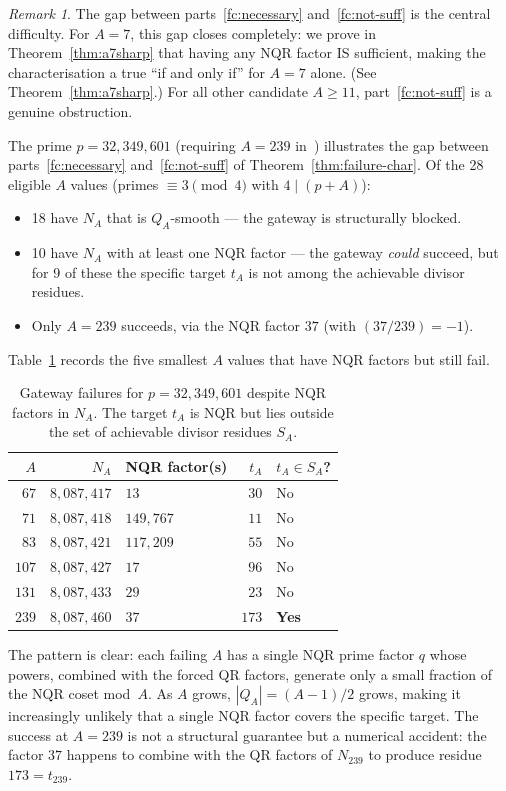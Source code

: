 \documentclass[12pt]{amsart}
\theoremstyle{definition}
\theoremstyle{remark}
\newtheorem{remark}[theorem]{Remark}
\begin{document}
\begin{remark}\label{rem:iff-a7}
The gap between parts~\ref{fc:necessary} and~\ref{fc:not-suff}
is the central difficulty.
For $A = 7$, this gap closes completely: we prove in
Theorem~\ref{thm:a7sharp} that having any NQR factor IS sufficient,
making the characterisation a true ``if and only if'' for $A = 7$ alone.
(See Theorem~\ref{thm:a7sharp}.)
For all other candidate $A \ge 11$, part~\ref{fc:not-suff} is a genuine obstruction.
\end{remark}

\begin{example}\label{ex:hardest}
The prime $p = 32{,}349{,}601$ (requiring $A = 239$ in~\cite{Gateway2026})
illustrates the gap between parts~\ref{fc:necessary} and~\ref{fc:not-suff}
of Theorem~\ref{thm:failure-char}.
Of the 28 eligible $A$ values (primes $\equiv 3 \pmod 4$ with $4 \mid (p+A)$):
\begin{itemize}
  \item 18 have $N_A$ that is $Q_A$-smooth --- the gateway is structurally blocked.
  \item 10 have $N_A$ with at least one NQR factor ---
    the gateway \emph{could} succeed, but for 9 of these the specific
    target $t_A$ is not among the achievable divisor residues.
  \item Only $A = 239$ succeeds, via the NQR factor $37$
    (with $(37/239) = -1$).
\end{itemize}
Table~\ref{tab:hardest} records the five smallest $A$ values that have
NQR factors but still fail.

\begin{table}[ht]
\centering
\caption{Gateway failures for $p = 32{,}349{,}601$ despite NQR factors in $N_A$.
The target $t_A$ is NQR but lies outside the set of achievable
divisor residues $S_A$.}
\label{tab:hardest}
\begin{tabular}{@{}rrlrl@{}}
\toprule
$A$ & $N_A$ & NQR factor(s) & $t_A$ & $t_A \in S_A$? \\
\midrule
$67$  & $8{,}087{,}417$ & $13$ & $30$ & No \\
$71$  & $8{,}087{,}418$ & $149{,}767$ & $11$ & No \\
$83$  & $8{,}087{,}421$ & $117{,}209$ & $55$ & No \\
$107$ & $8{,}087{,}427$ & $17$ & $96$ & No \\
$131$ & $8{,}087{,}433$ & $29$ & $23$ & No \\
\midrule
$239$ & $8{,}087{,}460$ & $37$ & $173$ & \textbf{Yes} \\
\bottomrule
\end{tabular}
\end{table}

The pattern is clear: each failing $A$ has a single NQR prime factor $q$
whose powers, combined with the forced QR factors, generate only a small
fraction of the NQR coset mod~$A$.
As $A$ grows, $|Q_A| = (A-1)/2$ grows, making it increasingly unlikely
that a single NQR factor covers the specific target.
The success at $A = 239$ is not a structural guarantee but a numerical accident:
the factor $37$ happens to combine with the QR factors of $N_{239}$
to produce residue $173 = t_{239}$.
\end{example}
\end{document}
